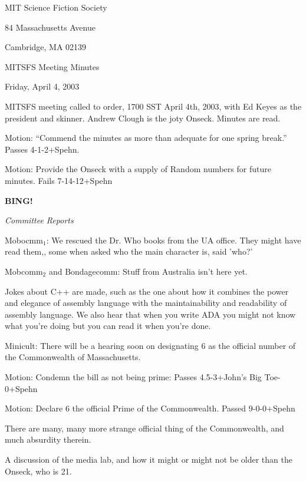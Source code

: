 \documentclass[12pt]{article}
\newcommand{\bing}{{\bf BING!} }
\newcommand{\goto}[1]{\bing \vskip 12pt \centerline{{\em{#1}}}}
\begin{document}
\begin{center}

MIT Science Fiction Society 

84 Massachusetts Avenue

Cambridge, MA 02139

\vspace{12pt}

MITSFS Meeting Minutes 

Friday, April 4, 2003

\end{center}
 
\vspace{18pt}

\setlength{\parskip}{6pt}

\noindent
MITSFS meeting called to order, 1700 SST April 4th, 2003, with Ed Keyes as the  president and  skinner.  Andrew Clough is the joty Onseck.  Minutes are read.

Motion:  ``Commend the minutes as more than adequate for one spring break.''  Passes 4-1-2+Spehn.

Motion:  Provide the Onseck with a supply of Random numbers for future minutes.  Fails 7-14-12+Spehn


\goto{Committee Reports}

Mobocmm$_1$:  We rescued the Dr. Who books from the UA office. They might have read them,, some when asked who the main character is, said 'who?'

Mobcomm$_2$ and Bondagecomm:  Stuff from Australia isn't here yet.

Jokes about C++ are made, such as the one about how it combines the power and elegance of assembly language with the maintainability and readability of assembly language.  We also hear that when you write ADA you might not know what you're doing but you can read it when you're done.

Minicult:  There will be a hearing soon on designating 6 as the official number of the Commonwealth of Massachusetts.

Motion:  Condemn the bill as not being prime:  Passes 4.5-3+John's Big Toe-0+Spehn

Motion: Declare 6 the official Prime of the Commonwealth.  Passed 9-0-0+Spehn

There are many, many more strange official thing of the Commonwealth, and much absurdity therein.

A discussion of the media lab, and how it might or might not be older than the Onseck, who is 21.
\end{document}
